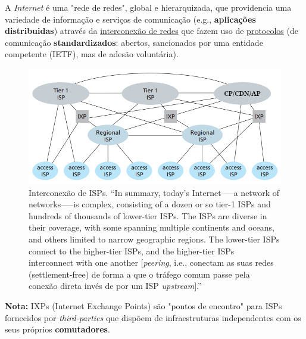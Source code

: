 A \textit{Internet} é uma "rede de redes", global e hierarquizada, que providencia uma variedade de informação e serviços de comunicação (e.g., \textbf{aplicações distribuidas}) através da \underline{interconexão de redes} que fazem uso de \underline{protocolos} (de comunicação \textbf{standardizados}: abertos, sancionados por uma entidade competente (IETF), mas de adesão voluntária).

\begin{figure}[H]
    \centering
    \includegraphics[width = 0.9\linewidth]{img/1/internet-ISP-interconnection.png}
    \caption{Interconexão de ISPs. ``In summary, today’s Internet--—a network of networks—--is complex, consisting of a dozen or so tier-1 ISPs and hundreds of thousands of lower-tier ISPs. The ISPs are diverse in their coverage, with some spanning multiple continents and oceans, and others limited to narrow geographic regions. The lower-tier ISPs connect to the higher-tier ISPs, and the higher-tier ISPs interconnect with one another $[$\textit{peering}, i.e., conectam as suas redes (settlement-free) de forma a que o tráfego comum passe pela conexão direta invés de por um ISP \textit{upstream}$]$.''\cite{Kurose2017}}
    \label{fig:internet}
\end{figure}

\vspace{-2em}
\begin{center}
\end{center}

\vspace{-0.5em}
\noindent \textbf{Nota:} IXPs {\small(Internet Exchange Points)} são "pontos de encontro" para ISPs fornecidos por \textit{third-parties} que dispõem de infraestruturas independentes com os seus próprios \textbf{comutadores}.
\clearpage
